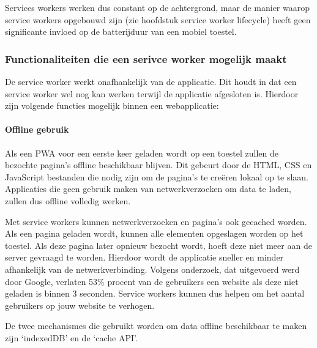 		\autocite{Verdu2015}
		\autocite{Hiltunen2018}
		
		
		Services workers werken dus constant op de achtergrond, maar de manier waarop service workers opgebouwd zijn (zie hoofdstuk service worker lifecycle) heeft geen significante invloed op de batterijduur van een mobiel toestel.
		
		\autocite{Malavolta2016}
	
	
	\subsubsection{Functionaliteiten die een serivce worker mogelijk maakt}
	
		De service worker werkt onafhankelijk van de applicatie. Dit houdt in dat een service worker wel nog kan werken terwijl de applicatie afgesloten is. Hierdoor zijn volgende functies mogelijk binnen een webapplicatie:
	
		
		
		\paragraph{Offline gebruik}
		
			Als een PWA voor een eerste keer geladen wordt op een toestel zullen de bezochte pagina's offline beschikbaar blijven. Dit gebeurt door de  HTML, CSS en JavaScript bestanden die nodig zijn om de pagina's te creëren lokaal op te slaan. Applicaties die geen gebruik maken van netwerkverzoeken om data te laden, zullen dus offline volledig werken.
			
			Met service workers kunnen netwerkverzoeken en pagina’s ook gecached worden. Als een pagina geladen wordt, kunnen alle elementen opgeslagen worden op het toestel. Als deze pagina later opnieuw bezocht wordt, hoeft deze niet meer aan de server gevraagd te worden. Hierdoor wordt de applicatie sneller en minder afhankelijk van de netwerkverbinding.
			Volgens onderzoek, dat uitgevoerd werd door Google, verlaten 53\% procent van de gebruikers een website als deze niet geladen is binnen 3 seconden. Service workers kunnen dus helpen om het aantal gebruikers op jouw website te verhogen.
			
			\autocite{Google2017}
			
			De twee mechanismes die gebruikt worden om data offline beschikbaar te maken zijn ‘indexedDB’ en de ‘cache API’.
			\autocite{Osmani2019}
			\autocite{Mozilla2020a}
			
			
			

